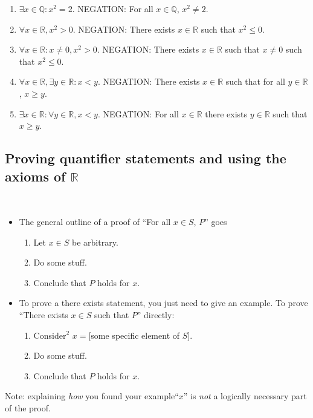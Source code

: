 \documentclass[12pt]{amsart}
\newcommand{\Q}{\mathbb{Q}}
\newcommand{\R}{{\mathbb{R}}}
\numberwithin{equation}{section}
\theoremstyle{plain} %
\theoremstyle{definition}
\theoremstyle{remark}
\begin{document}
\begin{enumerate}
\begin{framed}
\begin{enumerate}
\item  $\exists x\in \Q: x^2 = 2$. NEGATION: For all $x\in \Q$, $x^2\neq 2$.
\item $\forall x\in \R,  x^2 >0$. NEGATION: There exists $x\in \R$ such that $x^2 \leq 0$.
\item $\forall x\in \R: x\neq 0,  x^2 >0$. NEGATION: There exists $x\in \R$ such that $x\neq 0$ such that $x^2 \leq 0$.
\item $\forall x\in \R, \exists y\in \R: x<y$. NEGATION: There exists $x\in \R$ such that for all $y\in \R$, $x\geq y$.
\item $\exists x\in \R: \forall y\in \R, x<y$. NEGATION: For all $x\in \R$ there exists $y\in \R$ such that $x\geq y$.
\end{enumerate}
\end{framed}
\end{enumerate}



\subsection*{Proving quantifier statements and using the axioms of $\R$}


\

\begin{framed}
\begin{itemize}
\item The general outline of a proof of ``For all $x\in S$, $P$'' goes
\begin{enumerate}
\item Let $x\in S$ be arbitrary.
\item Do some stuff.
\item Conclude that $P$ holds for $x$.
\end{enumerate}
\item To prove a there exists statement, you just need to give an example. To prove ``There exists $x\in S$ such that $P$'' directly:
\begin{enumerate}
\item Consider$^{\textrm{2}}$ $x=$[some specific element of $S$].
\item Do some stuff.
\item Conclude that $P$ holds for $x$.
\end{enumerate}
\end{itemize}
Note: explaining \emph{how} you found your example``$x$'' is \emph{not} a logically necessary part of the proof. 
\end{framed}
\end{document}
